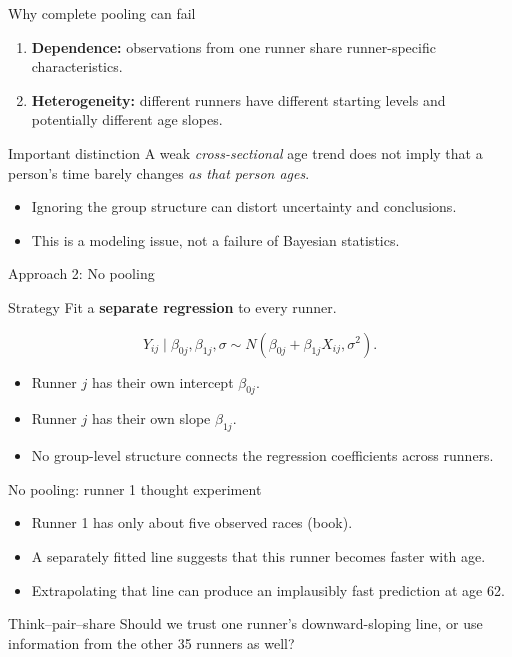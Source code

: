 \documentclass[aspectratio=43,11pt]{beamer}
\begin{document}
\begin{frame}{Why complete pooling can fail}
\begin{enumerate}
\item \textbf{Dependence:} observations from one runner share runner-specific characteristics.
\item \textbf{Heterogeneity:} different runners have different starting levels and potentially different age slopes.
\end{enumerate}
\begin{block}{Important distinction}
A weak \emph{cross-sectional} age trend does not imply that a person's time barely changes \emph{as that person ages}.
\end{block}
\begin{itemize}
\item Ignoring the group structure can distort uncertainty and conclusions.
\item This is a modeling issue, not a failure of Bayesian statistics.
\end{itemize}
\end{frame}

\begin{frame}{Approach 2: No pooling}
\begin{block}{Strategy}
Fit a \textbf{separate regression} to every runner.
\end{block}
\[
Y_{ij}\mid\beta_{0j},\beta_{1j},\sigma\sim
N(\beta_{0j}+\beta_{1j}X_{ij},\sigma^2).
\]
\begin{itemize}
\item Runner \(j\) has their own intercept \(\beta_{0j}\).
\item Runner \(j\) has their own slope \(\beta_{1j}\).
\item No group-level structure connects the regression coefficients across runners.
\end{itemize}
\end{frame}

\begin{frame}{No pooling: runner 1 thought experiment}
\begin{itemize}
\item Runner 1 has only about five observed races (book).
\item A separately fitted line suggests that this runner becomes faster with age.
\item Extrapolating that line can produce an implausibly fast prediction at age 62.
\end{itemize}
\begin{block}{Think--pair--share}
Should we trust one runner's downward-sloping line, or use information from the other 35 runners as well?
\end{block}
\end{frame}
\end{document}
